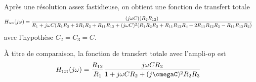 Après une résolution assez fastidieuse, on obtient une fonction de transfert
totale
\begin{equation}
    H_{\mathrm{tot}}(j\omega) = \frac{(j\omega C)(R_2R_{12})}
    {R_1 + j\omega C(R_1R_3+2R_1R_2+R_{11}R_{12}
        + (j\omega C)^2(R_1R_2R_3 + R_{11}R_{12}R_3 + 2R_{11}R_{12}R_2
        - R_{11}R_{12}R_2)}
\end{equation}
avec l'hypothèse $C_2 = C_3 = C$.

À titre de comparaison, la fonction de transfert totale avec l'ampli-op est
\begin{equation}
    H\ind{tot}(j\omega) = \frac{R_{12}}{R_1}\frac{j\omega CR_2}
    {1+j\omega CR_2 + (j\omegaC)^2R_2R_3}
\end{equation}
